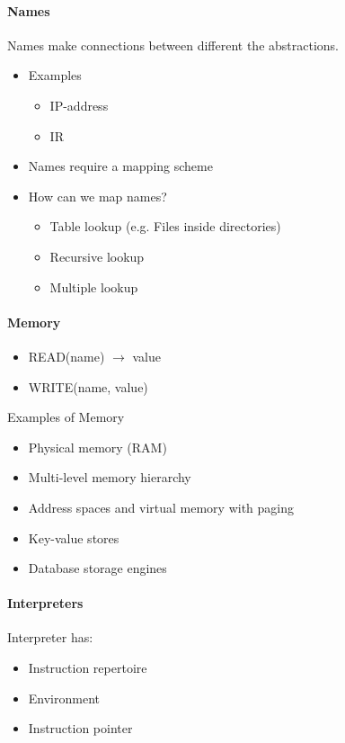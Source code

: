 \paragraph{Names}
Names make connections between different the abstractions.

\begin{itemize}
\item Examples
  \begin{itemize}
  \item IP-address
  \item IR
  \end{itemize}
\item Names require a mapping scheme
\item How can we map names?
  \begin{itemize}
  \item Table lookup (e.g. Files inside directories)
  \item Recursive lookup
  \item Multiple lookup
  \end{itemize}
\end{itemize}

\paragraph{Memory}
\begin{itemize}
\item READ(name) $\rightarrow$ value
\item WRITE(name, value)
\end{itemize}

Examples of Memory
\begin{itemize}
\item Physical memory (RAM)
\item Multi-level memory hierarchy
\item Address spaces and virtual memory with paging
\item Key-value stores
\item Database storage engines
\end{itemize}


\paragraph{Interpreters}
Interpreter has:
\begin{itemize}
\item Instruction repertoire
\item Environment
\item Instruction pointer
\end{itemize}

